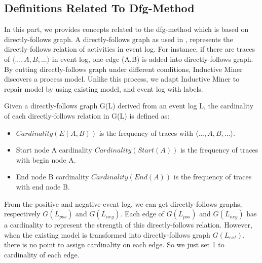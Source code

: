 
\subsection{Definitions Related To Dfg-Method}
In this part, we provides concepts related to the dfg-method which is based on directly-follows graph. A directly-follows graph as used in \cite{leemans2013discovering}, represents the directly-follows relation of activities in event log. For instance, if there are traces of $\langle ...,A,B,... \rangle$ in event log, one edge (A,B) is added into directly-follows graph. By cutting directly-follows graph under different conditions, Inductive Miner\cite{leemans2013discovering,leemans2014discovering} discovers a process model. Unlike this process, we adapt Inductive Miner to repair model by using existing model, and event log with labels.

\begin{definition}
	Given a directly-follows graph G(L) derived from an event log L, the cardinality of each directly-follows relation in G(L) is defined as:  
	\begin{itemize}
		\item $Cardinality(E(A,B))$ is the frequency of traces with $\langle ...,A,B,... \rangle$. 
		\item Start node A cardinality $Cardinality(Start(A))$ is the frequency of traces with begin node A.
		\item End node B cardinality $Cardinality(End(A))$ is the frequency of traces with end node B.
	\end{itemize}	
\end{definition}
From the positive and negative event log, we can get directly-follows graphs, respectively $G(L_{pos})$ and $G(L_{neg})$. Each edge of  $G(L_{pos})$ and $G(L_{neg})$ has a cardinality to represent the strength of this directly-follows relation. 
However, when the existing model is transformed into  directly-follows graph $G(L_{ext})$, there is no point to assign cardinality on each edge. So we just set 1 to cardinality of each edge. 

